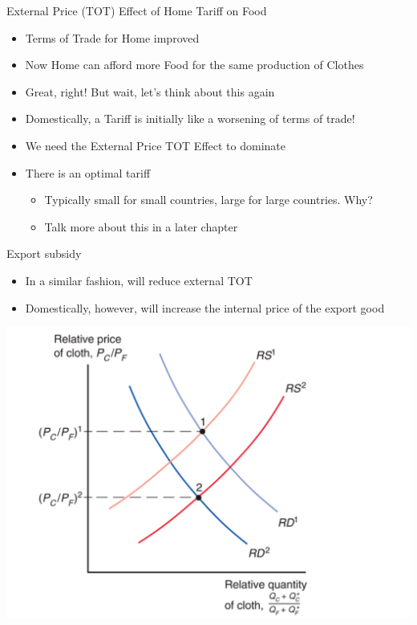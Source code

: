 \documentclass[ignorenonframetext,]{beamer}
\begin{document}
\begin{frame}{External Price (TOT) Effect of Home Tariff on Food}

    \begin{itemize}
        \item Terms of Trade for Home improved
        \item Now Home can afford more Food for the same production of Clothes
        \item Great, right! But wait, let's think about this again
        \item Domestically, a Tariff is initially like a worsening of terms of trade!
        \item We need the External Price TOT Effect to dominate 
        \item There is an optimal tariff
        \begin{itemize}
            \item Typically small for small countries, large for large countries.  Why?
            \item Talk more about this in a later chapter
        \end{itemize}
    \end{itemize}

\end{frame}

\begin{frame}{Export subsidy}

    \begin{itemize}
        \item In a similar fashion, will reduce external TOT
        \item Domestically, however, will increase the internal price of the export good
    \end{itemize}

    \includegraphics[scale=0.20]{export_subsidy_tot.png}

\end{frame}
\end{document}
